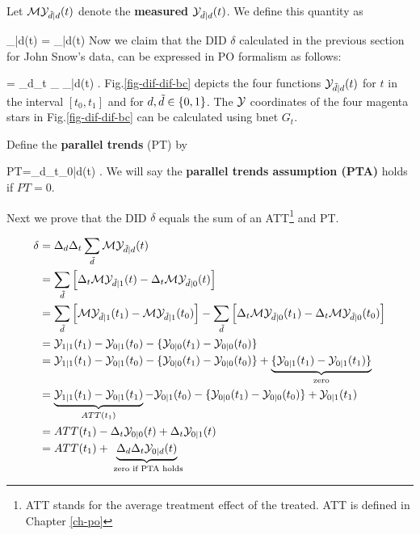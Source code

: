 Let ${\cal M}{\cal Y}_{{\tilde{d}}|d}(t)$ denote the
{\bf measured ${\cal Y}_{{\tilde{d}}|d}(t)$}.
We define this quantity as

\beq
\calm\caly_{\td|d}(t)
=
\caly_{\td|d}(t)
\left[ \indi(\td=0, t=t_0)+
\indi(\td=d, t=t_1)\right]
\eeq
Now we claim that the DID 
$\delta$ calculated in the 
previous section for
John Snow's data,
can be expressed in PO formalism as follows:

\beq
\delta=
\Delta_d\Delta_t \sum_\td 
\calm\caly_{\td|d}(t)
\;.
\eeq
Fig.\ref{fig-dif-dif-bc}
depicts the
four functions
${\cal Y}_{{\tilde{d}}|d}(t)$
for $t$ in the interval  $[t_0, t_1]$
and for $d,{\tilde{d}}\in \{0,1\}$.
The ${\cal Y}$ coordinates
of the four magenta stars in 
Fig.\ref{fig-dif-dif-bc} can 
be calculated using bnet $G_t$.

Define
the {\bf parallel trends} (PT)
by 

\beq
PT=\Delta_d\Delta_t\caly_{0|d}(t)
\;.
\eeq
We will say the 
{\bf parallel trends assumption (PTA)}
holds if $PT=0$.

Next we prove that
the DID $\delta$ equals
the sum of an ATT\footnote{ATT stands for 
the average treatment effect
of the treated. ATT is defined 
in Chapter \ref{ch-po}} 
and PT.

\begin{align}
\delta&=
\Delta_d\Delta_t \sum_{\tilde{d}} 
{\cal M}{\cal Y}_{{\tilde{d}}|d}(t)
\\
&=
\sum_{\tilde{d}} 
\left[
\Delta_t {\cal M}{\cal Y}_{{\tilde{d}}|1}(t)
-\Delta_t {\cal M}{\cal Y}_{{\tilde{d}}|0}(t)
\right]
\\
&=
\sum_{\tilde{d}} 
\left[
{\cal M}{\cal Y}_{{\tilde{d}}|1}(t_1)
-
{\cal M}{\cal Y}_{{\tilde{d}}|1}(t_0)
\right]
-\sum_{\tilde{d}}\left[
\Delta_t {\cal M}{\cal Y}_{{\tilde{d}}|0}(t_1)
-
\Delta_t {\cal M}{\cal Y}_{{\tilde{d}}|0}(t_0)
\right]
\\
&=
{\cal Y}_{1|1}(t_1)-{\cal Y}_{0|1}(t_0)
-\{
{\cal Y}_{0|0}(t_1)-{\cal Y}_{0|0}(t_0)
\}
\\
&=
{\cal Y}_{1|1}(t_1)-{\cal Y}_{0|1}(t_0)
-\{
{\cal Y}_{0|0}(t_1)-{\cal Y}_{0|0}(t_0)
\}
+\underbrace{
\{
{\cal Y}_{0|1}(t_1)-
{\cal Y}_{0|1}(t_1)
\}}_{\text{ zero }}
\\
&=
\underbrace{
{\cal Y}_{1|1}(t_1) - {\cal Y}_{0|1}(t_1)}
_{ATT(t_1)}
-{\cal Y}_{0|1}(t_0)
-\{
{\cal Y}_{0|0}(t_1)-{\cal Y}_{0|0}(t_0)
\}
 + {\cal Y}_{0|1}(t_1)
\\
&=
ATT(t_1)
-\Delta_t {\cal Y}_{0|0}(t)
+\Delta_t {\cal Y}_{0|1}(t)
\\
&=
ATT(t_1)
+
\underbrace{\Delta_d\Delta_t{\cal Y}_{0|d}(t)}_
{\text{ zero if PTA holds}}
\end{align}





